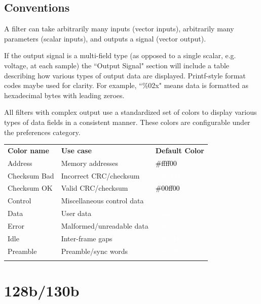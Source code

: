 \subsection{Conventions}

A filter can take arbitrarily many inputs (vector inputs), arbitrarily many parameters (scalar inputs), and outputs a
signal (vector output).

If the output signal is a multi-field type (as opposed to a single scalar, e.g. voltage, at each sample) the
``Output Signal" section will include a table describing how various types of output data are displayed. Printf-style
format codes maybe used for clarity. For example, ``\%02x" means data is formatted as hexadecimal bytes with leading
zeroes.

All filters with complex output use a standardized set of colors to display various types of data fields in a
consistent manner. These colors are configurable under the  preferences category.

\begin{tabularx}{16cm}{llX}
\thickhline
\textbf{Color name} & \textbf{Use case} & \textbf{Default Color} \\
\thickhline
Address & Memory addresses & \cellcolor{address}\textcolor{black}{\#ffff00} \\
\thickhline
Checksum Bad & Incorrect CRC/checksum & \cellcolor{checksumbad}\textcolor{white}{\#ff0000} \\
\thickhline
Checksum OK & Valid CRC/checksum & \cellcolor{checksumok}\textcolor{black}{\#00ff00} \\
\thickhline
Control & Miscellaneous control data & \cellcolor{control}\textcolor{white}{\#c000a0} \\
\thickhline
Data & User data & \cellcolor{data}\textcolor{white}{\#336699} \\
\thickhline
Error & Malformed/unreadable data & \cellcolor{error}\textcolor{white}{\#ff0000} \\
\thickhline
Idle & Inter-frame gaps & \cellcolor{idle}\textcolor{white}{\#404040} \\
\thickhline
Preamble & Preamble/sync words & \cellcolor{preamble}\textcolor{white}{\#808080} \\
\thickhline
\end{tabularx}

\pagebreak
\section{128b/130b}
\label{filter:128b130b}

